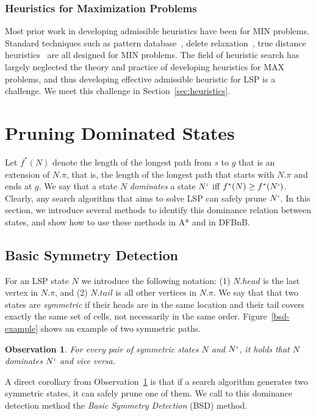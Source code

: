 \documentclass[letterpaper]{article} %
\newcommand\AF[1]{\nb{\textbf{Ariel:}}{red}{#1}}
\newcommand\Roni[1]{\nb{\textbf{Roni:}}{blue}{#1}}
\newtheorem{observation}{Observation}
\begin{document}
\subsubsection{Heuristics for Maximization Problems}
Most prior work in developing admissible heuristics have been for MIN problems. Standard techniques such as pattern database~\cite{culberson1998pattern,felner2004additive,edelkamp2014planning,haslum2007domain},  delete relaxation~\cite{hoffmann2001ff}, true distance heuristics~\cite{sturtevant2009memory,goldenberg2010portal} are all designed for MIN problems. The field of heuristic search has largely neglected the theory and practice of developing heuristics for MAX problems, and thus developing effective admissible heuristic for LSP is a challenge. We meet this challenge in Section~\ref{sec:heuristics}.





\section{Pruning Dominated States}
\label{sec:prunning}


Let $f^*(N)$ denote the length of the longest path from $s$ to $g$ that is an extension of $N.\pi$,
that is, the length of the longest path that starts with $N.\pi$ and ends at $g$.
We say that a state $N$ \emph{dominates} a state $N`$ iff
$f^*(N)\geq f^*(N`)$.
Clearly, any search algorithm that aims to solve LSP can safely prune $N`$. In this section, we introduce several methods to identify this dominance relation between states, and show how to use these methods in A* and in DFBnB.


\subsection{Basic Symmetry Detection}
For an LSP state $N$ we introduce the following notation:
(1) $N.head$ is the last vertex in $N.\pi$,
and (2) $N.tail$ is all other vertices in $N.\pi$.
We say that that two states are {\em symmetric} if their heads are in the same location and their tail covers exactly the same set of cells, not necessarily in the same order. Figure~\ref{bsd-example} shows an example of two symmetric paths.
\begin{observation}
For every pair of symmetric states $N$ and $N`$, it holds that $N$ dominates $N`$ and vice versa.
\label{obs:symmetry}
\end{observation}
A direct corollary from Observation~\ref{obs:symmetry} is that if a search algorithm generates two symmetric states, it can safely prune one of them. We call to this dominance detection method the {\em Basic Symmetry Detection} (BSD) method.
\end{document}
